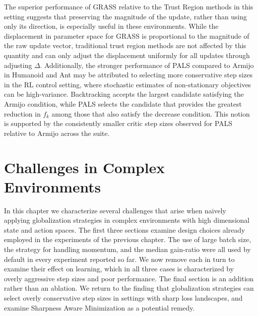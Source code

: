 The superior performance of GRASS relative to the Trust Region methods in this setting suggests that preserving the magnitude of the update, rather than using only its direction, is especially useful in these environments. While the displacement in parameter space for GRASS is proportional to the magnitude of the raw update vector, traditional trust region methods are not affected by this quantity and can only adjust the displacement uniformly for all updates through adjusting $\Delta$. Additionally, the stronger performance of PALS compared to Armijo in Humanoid and Ant may be attributed to selecting more conservative step sizes in the RL control setting, where stochastic estimates of non-stationary objectives can be high-variance. Backtracking accepts the largest candidate satisfying the Armijo condition, while PALS selects the candidate that provides the greatest reduction in $f_k$ among those that also satisfy the decrease condition. This notion is supported by the consistently smaller critic step sizes observed for PALS relative to Armijo across the suite.

\chapter{Challenges in Complex Environments} \label{sec: challenges}
In this chapter we characterize several challenges that arise when naively applying globalization strategies in complex environments with high dimensional state and action spaces.
The first three sections examine design choices already employed in the experiments of the previous chapter. The use of large batch size, the strategy for handling momentum, and the median gain-ratio were all used by default in every experiment reported so far. We now remove each in turn to examine their effect on learning, which in all three cases is characterized by overly aggressive step sizes and poor performance. The final section is an addition rather than an ablation. We return to the finding that globalization strategies can select overly conservative step sizes in settings with sharp loss landscapes, and examine Sharpness Aware Minimization as a potential remedy.


